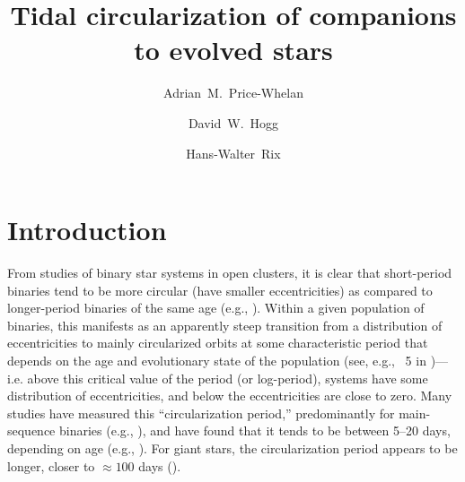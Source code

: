 \documentclass[modern, letterpaper]{aastex62}
\begin{document}
\sloppy\sloppypar\raggedbottom\frenchspacing %

\title{Tidal circularization of companions to evolved stars}

\author[0000-0003-0872-7098]{Adrian~M.~Price-Whelan}

\author[0000-0003-2866-9403]{David~W.~Hogg}

\author[0000-0003-4996-9069]{Hans-Walter~Rix}

\begin{abstract}\noindent %
\end{abstract}


\section{Introduction} \label{sec:intro}

From studies of binary star systems in open clusters, it is clear that
short-period binaries tend to be more circular (have smaller eccentricities) as
compared to longer-period binaries of the same age (e.g.,
\citealt{Mathieu:2005}).
Within a given population of binaries, this manifests as an apparently steep
transition from a distribution of eccentricities to mainly circularized orbits
at some characteristic period that depends on the age and evolutionary state of
the population (see, e.g., \figurename~5 in \citealt{Mathieu:2005})---i.e. above
this critical value of the period (or log-period), systems have some
distribution of eccentricities, and below the eccentricities are close to zero.
Many studies have measured this ``circularization period,'' predominantly for
main-sequence binaries (e.g., \citealt{Meibom:2006, Kjurkchieva:2017}), and
have found that it tends to be between 5--20 days, depending on age (e.g.,
\citealt{Mathieu:1988}).
For giant stars, the circularization period appears to be longer, closer to
$\approx 100$ days (\citealt{Mayor:1984}).
\end{document}
